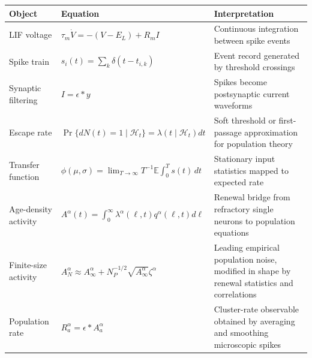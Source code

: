 \begin{chaptersummary}
\begin{center}
\renewcommand{\arraystretch}{1.45}
\begin{tabularx}{\textwidth}{@{}l X X@{}}
  \toprule
  \textbf{Object} & \textbf{Equation} & \textbf{Interpretation} \\
  \midrule
  LIF voltage &
  $\tau_m \dot V=-(V-E_L)+R_m I$ &
  Continuous integration between spike events \\
  Spike train &
  $s_i(t)=\sum_k\delta(t-t_{i,k})$ &
  Event record generated by threshold crossings \\
  Synaptic filtering &
  $I=\epsilon*y$ &
  Spikes become postsynaptic current waveforms \\
  Escape rate &
  $\Pr\{dN(t)=1\mid\mathcal H_t\}=\lambda(t\mid\mathcal H_t)dt$ &
  Soft threshold or first-passage approximation for population theory \\
  Transfer function &
  $\phi(\mu,\sigma)=\lim_{T\to\infty}T^{-1}\mathbb E\int_0^T s(t)\,dt$ &
  Stationary input statistics mapped to expected rate \\
  Age-density activity &
  $A^\alpha(t)=\int_0^\infty\lambda^\alpha(\ell,t)q^\alpha(\ell,t)d\ell$ &
  Renewal bridge from refractory single neurons to population equations \\
  Finite-size activity &
  $A_N^\alpha\approx A_\infty^\alpha+N_P^{-1/2}\sqrt{A_\infty^\alpha}\zeta^\alpha$ &
  Leading empirical population noise, modified in shape by renewal statistics and correlations \\
  Population rate &
  $R_a^\alpha=\epsilon*A_a^\alpha$ &
  Cluster-rate observable obtained by averaging and smoothing microscopic spikes \\
  \bottomrule
\end{tabularx}
\end{center}
\end{chaptersummary}

